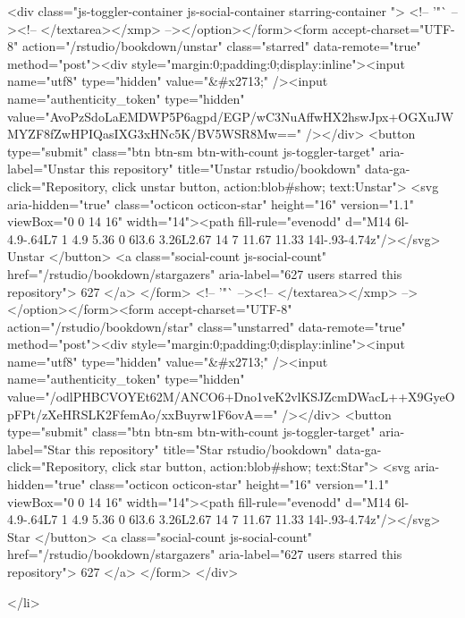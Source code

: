   <div class="js-toggler-container js-social-container starring-container ">
    <!-- '"` --><!-- </textarea></xmp> --></option></form><form accept-charset="UTF-8" action="/rstudio/bookdown/unstar" class="starred" data-remote="true" method="post"><div style="margin:0;padding:0;display:inline"><input name="utf8" type="hidden" value="&#x2713;" /><input name="authenticity_token" type="hidden" value="AvoPzSdoLaEMDWP5P6agpd/EGP/wC3NuAffwHX2hswJpx+OGXuJWMYZF8fZwHPIQasIXG3xHNc5K/BV5WSR8Mw==" /></div>
      <button
        type="submit"
        class="btn btn-sm btn-with-count js-toggler-target"
        aria-label="Unstar this repository" title="Unstar rstudio/bookdown"
        data-ga-click="Repository, click unstar button, action:blob#show; text:Unstar">
        <svg aria-hidden="true" class="octicon octicon-star" height="16" version="1.1" viewBox="0 0 14 16" width="14"><path fill-rule="evenodd" d="M14 6l-4.9-.64L7 1 4.9 5.36 0 6l3.6 3.26L2.67 14 7 11.67 11.33 14l-.93-4.74z"/></svg>
        Unstar
      </button>
        <a class="social-count js-social-count" href="/rstudio/bookdown/stargazers"
           aria-label="627 users starred this repository">
          627
        </a>
</form>
    <!-- '"` --><!-- </textarea></xmp> --></option></form><form accept-charset="UTF-8" action="/rstudio/bookdown/star" class="unstarred" data-remote="true" method="post"><div style="margin:0;padding:0;display:inline"><input name="utf8" type="hidden" value="&#x2713;" /><input name="authenticity_token" type="hidden" value="/odlPHBCVOYEt62M/ANCO6+Dno1veK2vlKSJZcmDWacL++X9GyeOpFPt/zXeHRSLK2FfemAo/xxBuyrw1F6ovA==" /></div>
      <button
        type="submit"
        class="btn btn-sm btn-with-count js-toggler-target"
        aria-label="Star this repository" title="Star rstudio/bookdown"
        data-ga-click="Repository, click star button, action:blob#show; text:Star">
        <svg aria-hidden="true" class="octicon octicon-star" height="16" version="1.1" viewBox="0 0 14 16" width="14"><path fill-rule="evenodd" d="M14 6l-4.9-.64L7 1 4.9 5.36 0 6l3.6 3.26L2.67 14 7 11.67 11.33 14l-.93-4.74z"/></svg>
        Star
      </button>
        <a class="social-count js-social-count" href="/rstudio/bookdown/stargazers"
           aria-label="627 users starred this repository">
          627
        </a>
</form>  </div>

  </li>

